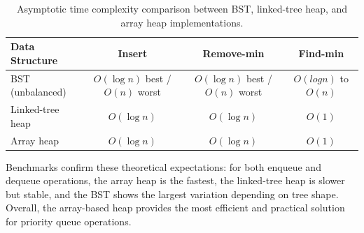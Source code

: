 \documentclass[a4paper,11pt]{article}
\begin{document}
\begin{table}[h]
\centering
\begin{tabular}{lccc}
\toprule
\textbf{Data Structure} & \textbf{Insert} & \textbf{Remove-min} & \textbf{Find-min} \\
\midrule
BST (unbalanced)     & $O(\log n)$ best / $O(n)$ worst & $O(\log n)$ best / $O(n)$ worst & $O(log n)$ to $O(n)$ \\
Linked-tree heap     & $O(\log n)$ & $O(\log n)$ & $O(1)$ \\
Array heap           & $O(\log n)$ & $O(\log n)$ & $O(1)$ \\
\bottomrule
\end{tabular}
\caption{Asymptotic time complexity comparison between BST, linked-tree heap, and array heap implementations.}
\label{tab:complexity-summary}
\end{table}

Benchmarks confirm these theoretical expectations: for both enqueue and dequeue operations, the array heap is the fastest, the linked-tree heap is slower but stable, and the BST shows the largest variation depending on tree shape. Overall, the array-based heap provides the most efficient and practical solution for priority queue operations.
\end{document}
